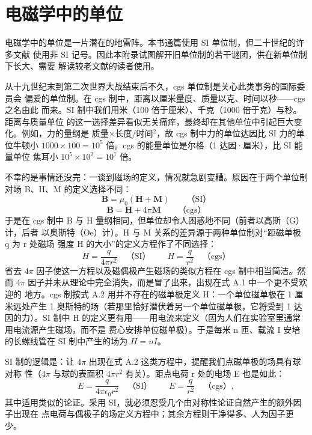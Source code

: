 \chapter{电磁学中的单位}

电磁学中的单位是一片潜在的地雷阵。本书通篇使用 SI 单位制，但二十世纪的许多文献
使用非 SI 记号。因此本附录试图解开旧单位制的若干谜团，供在新单位制下长大、需要
解读较老文献的读者使用。

从十九世纪末到第二次世界大战结束后不久，cgs 单位制是关心此类事务的国际委员会
偏爱的单位制。在 cgs 制中，距离以厘米量度、质量以克、时间以秒——cgs 之名由此
而来。SI 制中我们用米（100 倍于厘米）、千克（1000 倍于克）与秒。距离与质量单位
的这一选择差异看似无关痛痒，最终却在其他单位中引起巨大变化。例如，力的量纲是
质量×长度/时间$^{2}$，故 cgs 制中力的单位达因比 SI 力的单位牛顿小
$1000\times100=10^{5}$ 倍。cgs 的能量单位是尔格（1 达因·厘米），比 SI 能量单位
焦耳小 $10^{5}\times10^{2}=10^{7}$ 倍。

不幸的是事情还没完：一谈到磁场的定义，情况就急剧变糟。原因在于两个单位制对场
B、H、M 的定义选择不同：
\begin{equation*}
\mathbf{B} = \mu_0(\mathbf{H}+\mathbf{M}) \qquad\text{（SI）}
\end{equation*}
\begin{equation*}
\mathbf{B} = \mathbf{H} + 4\pi\mathbf{M} \qquad\text{（cgs）}\tag{A.1}
\end{equation*}
于是在 cgs 制中 B 与 H 量纲相同，但单位却令人困惑地不同（前者以高斯（G）计，后者
以奥斯特（Oe）计）。H 与 M 关系的差异源于两种单位制对“距磁单极 q 为 r 处磁场
强度 H 的大小”的定义方程作了不同选择：
\begin{equation*}
H = \frac{q}{4\pi r^{2}} \quad\text{（SI）}\qquad H = \frac{q}{r^{2}} \quad\text{（cgs）}\tag{A.2}
\end{equation*}
省去 $4\pi$ 因子使这一方程以及磁偶极产生磁场的类似方程在 cgs 制中相当简洁。然而
$4\pi$ 因子并未从理论中完全消失，而是冒了出来，出现在式 A.1 中一个更不受欢迎的
地方。cgs 制按式 A.2 用并不存在的磁单极定义 H：一个单位磁单极在 1 厘米远处产生
1 奥斯特的场（若那里恰好潜伏着另一个单位磁单极，它将受到 1 达因的力）。SI 制中
H 的定义更有用——用电流来定义（因为人们在实验室里通常用电流源产生磁场，而不是
费心安排单位磁单极）。于是每米 n 匝、载流 I 安培的长螺线管在 SI 制中产生的场为
$H=nI$。

SI 制的逻辑是：让 $4\pi$ 出现在式 A.2 这类方程中，提醒我们点磁单极的场具有球对称
性（$4\pi$ 与球的表面积 $4\pi r^{2}$ 有关）。距点电荷 r 处的电场 E 也是如此：
\begin{equation*}
E = \frac{q}{4\pi\epsilon_0 r^{2}} \quad\text{（SI）}\qquad E = \frac{q}{r^{2}} \quad\text{（cgs）},\tag{A.3}
\end{equation*}
其中适用类似的论证。采用 SI，就必须忍受几个由对称性论证自然产生的额外因子出现在
点电荷与偶极子的场定义方程中；其余方程则干净得多、人为因子更少。

